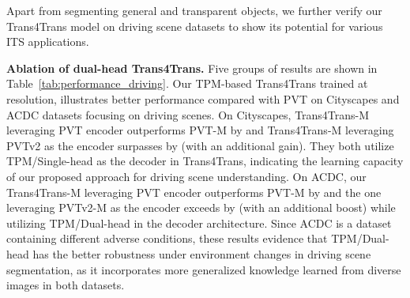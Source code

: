\documentclass[journal]{IEEEtran}
\begin{document}
Apart from segmenting general and transparent objects, we further verify our Trans4Trans model on driving scene datasets to show its potential for various ITS applications.

\noindent\textbf{Ablation of dual-head Trans4Trans.}
Five groups of results are shown in Table~\ref{tab:performance_driving}. Our TPM-based Trans4Trans trained at  resolution, illustrates better performance compared with PVT on Cityscapes and ACDC datasets focusing on driving scenes. On Cityscapes, Trans4Trans-M leveraging PVT encoder outperforms PVT-M by  and Trans4Trans-M leveraging PVTv2 as the encoder surpasses by  (with an additional  gain). They both utilize TPM/Single-head as the decoder in Trans4Trans, indicating the learning capacity of our proposed approach for driving scene understanding. On ACDC, our Trans4Trans-M leveraging PVT encoder outperforms PVT-M by  and the one leveraging PVTv2-M as the encoder exceeds by  (with an additional  boost) while utilizing TPM/Dual-head in the decoder architecture. Since ACDC is a dataset containing different adverse conditions, these results evidence that TPM/Dual-head has the better robustness under environment changes in driving scene segmentation, as it incorporates more generalized knowledge learned from diverse images in both datasets.
\end{document}
